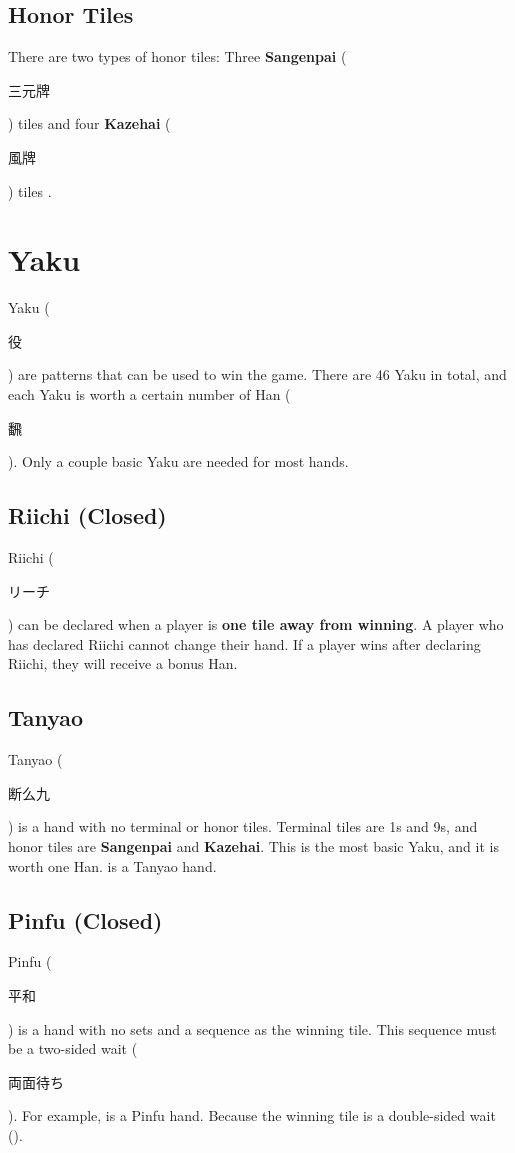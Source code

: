 \documentclass[8pt,landscape]{article}
\begin{document}
\begin{minipage}[t][.8\textheight][t]{\textwidth}
\begin{multicols*}{3}
    \subsection{Honor Tiles}
    There are two types of honor tiles:
    Three \textbf{Sangenpai} (\begin{CJK}{UTF8}{min}三元牌\end{CJK}) tiles  and four \textbf{Kazehai} (\begin{CJK}{UTF8}{min}風牌\end{CJK}) tiles .

    \section{Yaku}
    Yaku (\begin{CJK}{UTF8}{min}役\end{CJK}) are patterns that can be used to win the game.
    There are 46 Yaku in total, and each Yaku is worth a certain number of Han (\begin{CJK}{UTF8}{min}飜\end{CJK}).
    Only a couple basic Yaku are needed for most hands.

    \subsection{Riichi (Closed)}
    Riichi (\begin{CJK}{UTF8}{min}リーチ\end{CJK}) can be declared when a player is \textbf{one tile away from winning}.
    A player who has declared Riichi cannot change their hand.
    If a player wins after declaring Riichi, they will receive a bonus Han.

    \subsection{Tanyao}
    Tanyao (\begin{CJK}{UTF8}{min}断么九\end{CJK}) is a hand with no terminal or honor tiles.
    Terminal tiles are 1s and 9s, and honor tiles are \textbf{Sangenpai} and \textbf{Kazehai}.
    This is the most basic Yaku, and it is worth one Han.
     is a Tanyao hand.

    \subsection{Pinfu (Closed)}
    Pinfu (\begin{CJK}{UTF8}{min}平和\end{CJK}) is a hand with no sets and a sequence as the winning tile.
    This sequence must be a two-sided wait (\begin{CJK}{UTF8}{min}両面待ち\end{CJK}).
    For example,  is a Pinfu hand. Because the winning tile is a double-sided wait ().


\end{multicols*}
\end{minipage}
\end{document}
